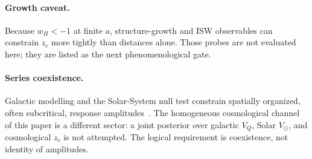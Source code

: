 \documentclass[11pt]{article}
\theoremstyle{definition}
\theoremstyle{remark}
\begin{document}
\paragraph{Growth caveat.}
Because $w_H<-1$ at finite $a$, structure-growth and ISW observables can constrain $z_c$ more tightly than distances alone.
Those probes are not evaluated here; they are listed as the next phenomenological gate.

\paragraph{Series coexistence.}
Galactic modelling and the Solar-System null test constrain spatially organized, often subcritical, response amplitudes~\cite{boyd2026galactic,boyd2026solar}.
The homogeneous cosmological channel of this paper is a different sector: a joint posterior over galactic $V_Q$, Solar $V_\odot$, and cosmological $z_c$ is not attempted.
The logical requirement is coexistence, not identity of amplitudes.
\end{document}
